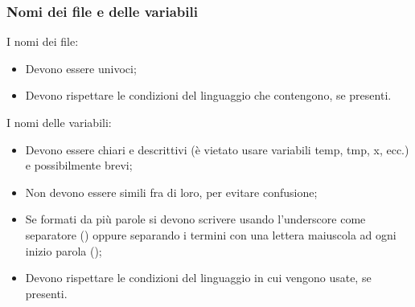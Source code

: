 \subsubsection{Nomi dei file e delle variabili}
I nomi dei file:
\begin{itemize}
    \item Devono essere univoci;
    \item Devono rispettare le condizioni del linguaggio che contengono, se presenti.
\end{itemize}
I nomi delle variabili:
\begin{itemize}
    \item Devono essere chiari e descrittivi (è vietato usare variabili temp, tmp, x, ecc.) e possibilmente brevi;
    \item Non devono essere simili fra di loro, per evitare confusione;
    \item Se formati da più parole si devono scrivere usando l'underscore come separatore () oppure separando i termini con una lettera maiuscola ad ogni inizio parola ();
    \item Devono rispettare le condizioni del linguaggio in cui vengono usate, se presenti.
\end{itemize}